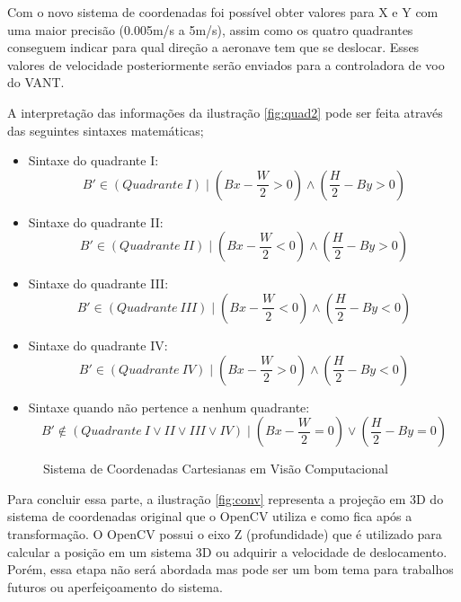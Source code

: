 Com o novo sistema de coordenadas foi possível obter valores para X e Y com uma maior precisão (0.005m/s a 5m/s), assim como os quatro quadrantes conseguem indicar para qual direção a aeronave tem que se deslocar. Esses valores de velocidade posteriormente serão enviados para a controladora de voo do VANT. 

A interpretação das informações da ilustração \ref{fig:quad2} pode ser feita através das seguintes sintaxes matemáticas; 

\begin{itemize}
	\item Sintaxe do quadrante I:\begin{equation}\label{q1} B'\in (Quadrante\ I) \mid \left(Bx - \frac{W}{2} >0\right) \land \left(\frac{H}{2} - By >0\right)\end{equation} 
	\item Sintaxe do quadrante II:\begin{equation}\label{q2} B'\in (Quadrante\ II) \mid \left(Bx - \frac{W}{2} <0\right) \land \left(\frac{H}{2} - By >0\right)\end{equation} 
	\item Sintaxe do quadrante III:\begin{equation}\label{q3} B'\in (Quadrante\ III) \mid \left(Bx - \frac{W}{2} <0\right) \land \left(\frac{H}{2} - By <0\right)\end{equation} 
	\item Sintaxe do quadrante IV:\begin{equation}\label{q4} B'\in (Quadrante\ IV) \mid \left(Bx - \frac{W}{2} >0\right) \land \left(\frac{H}{2} - By <0\right)\end{equation} 
	\item Sintaxe quando não pertence a nenhum quadrante:\begin{equation}\label{nq} B'\notin ( Quadrante\ I\lor II\lor III\lor IV) \mid \left(Bx - \frac{W}{2}=0\right) \lor \left(\frac{H}{2} - By =0\right)\end{equation}
\end{itemize} 

\begin{figure}[H]
	\centering
	\caption{Sistema de Coordenadas Cartesianas em Visão Computacional}
	
	\label{fig:teste}
\end{figure}

Para concluir essa parte, a ilustração \ref{fig:conv} representa a projeção em 3D do sistema de coordenadas original que o OpenCV utiliza e como fica após a transformação. O OpenCV possui o eixo Z (profundidade) que é utilizado para calcular a posição em um sistema 3D ou adquirir a velocidade de deslocamento. Porém, essa etapa não será abordada mas pode ser um bom tema para trabalhos futuros ou aperfeiçoamento do sistema.


